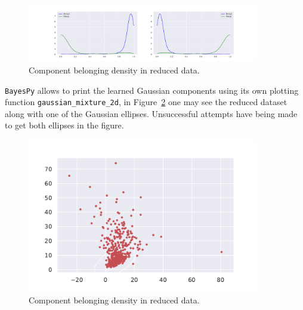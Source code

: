 \begin{figure}[h!]
  \centering
  \includegraphics[width=0.9\textwidth]{tex/images/proba_reduced_bayes.pdf}
  \caption{Component belonging density in reduced data.}\label{fig:proba_reduced_bayes}
\end{figure}

\texttt{BayesPy} allows to print the learned Gaussian components using its own plotting function \texttt{gaussian\_mixture\_2d}, in Figure~\ref{fig:bayespy_red_cancer} one may see the reduced dataset along with one of the Gaussian ellipses. Unsuccessful attempts have being made to get both ellipses in the figure.

\begin{figure}[h!]
  \centering
  \includegraphics[width=0.9\textwidth]{tex/images/bayespy_cancer_red.pdf}
  \caption{Component belonging density in reduced data.}\label{fig:bayespy_red_cancer}
\end{figure}
